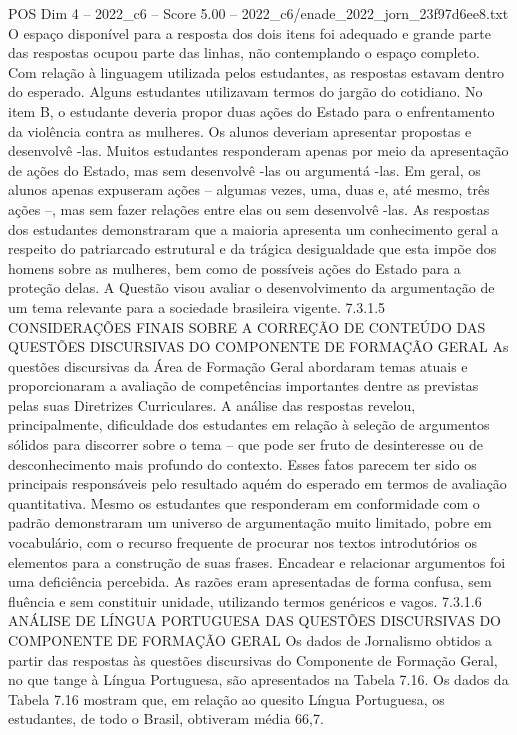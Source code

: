 \begin{textsample}{POS Dim 4 – 2022\_c6 – Score 5.00 – 2022\_c6/enade\_2022\_jorn\_23f97d6ee8.txt}
O espaço disponível para a resposta dos dois itens foi adequado e grande parte das respostas ocupou parte das linhas, não contemplando o espaço completo.
Com relação à linguagem utilizada pelos estudantes, as respostas estavam dentro do esperado.
Alguns estudantes utilizavam termos do jargão do cotidiano.
No item B, o estudante deveria propor duas ações do Estado para o enfrentamento da violência contra as mulheres.
Os alunos deveriam apresentar propostas e desenvolvê -las.
Muitos estudantes responderam apenas por meio da apresentação de ações do Estado, mas sem desenvolvê -las ou argumentá -las.
Em geral, os alunos apenas expuseram ações – algumas vezes, uma, duas e, até mesmo, três ações –, mas sem fazer relações entre elas ou sem desenvolvê -las.
As respostas dos estudantes demonstraram que a maioria apresenta um conhecimento geral a respeito do patriarcado estrutural e da trágica desigualdade que esta impõe dos homens sobre as mulheres, bem como de possíveis ações do Estado para a proteção delas.
A Questão visou avaliar o desenvolvimento da argumentação de um tema relevante para a sociedade brasileira vigente. 7.3.1.5 CONSIDERAÇÕES FINAIS SOBRE A CORREÇÃO DE CONTEÚDO DAS QUESTÕES DISCURSIVAS DO COMPONENTE DE FORMAÇÃO GERAL As questões discursivas da Área de Formação Geral abordaram temas atuais e proporcionaram a avaliação de competências importantes dentre as previstas pelas suas Diretrizes Curriculares.
A análise das respostas revelou, principalmente, dificuldade dos estudantes em relação à seleção de argumentos sólidos para discorrer sobre o tema – que pode ser fruto de desinteresse ou de desconhecimento mais profundo do contexto.
Esses fatos parecem ter sido os principais responsáveis pelo resultado aquém do esperado em termos de avaliação quantitativa.
Mesmo os estudantes que responderam em conformidade com o padrão demonstraram um universo de argumentação muito limitado, pobre em vocabulário, com o recurso frequente de procurar nos textos introdutórios os elementos para a construção de suas frases.
Encadear e relacionar argumentos foi uma deficiência percebida.
As razões eram apresentadas de forma confusa, sem fluência e sem constituir unidade, utilizando termos genéricos e vagos. 7.3.1.6 ANÁLISE DE LÍNGUA PORTUGUESA DAS QUESTÕES DISCURSIVAS DO COMPONENTE DE FORMAÇÃO GERAL Os dados de Jornalismo obtidos a partir das respostas às questões discursivas do Componente de Formação Geral, no que tange à Língua Portuguesa, são apresentados na Tabela 7.16.
Os dados da Tabela 7.16 mostram que, em relação ao quesito Língua Portuguesa, os estudantes, de todo o Brasil, obtiveram média 66,7.

\end{textsample}
